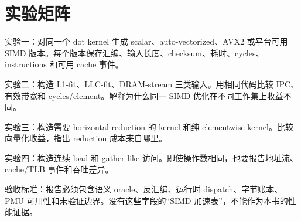 \section{实验矩阵}

实验一：对同一个 dot kernel 生成 scalar、auto-vectorized、AVX2 或平台可用 SIMD 版本。每个版本保存汇编、输入长度、checksum、耗时、cycles、instructions 和可用 cache 事件。

实验二：构造 L1-fit、LLC-fit、DRAM-stream 三类输入。用相同代码比较 IPC、有效带宽和 cycles/element。解释为什么同一 SIMD 优化在不同工作集上收益不同。

实验三：构造需要 horizontal reduction 的 kernel 和纯 elementwise kernel。比较向量化收益，指出 reduction 成本来自哪里。

实验四：构造连续 load 和 gather-like 访问。即使操作数相同，也要报告地址流、cache/TLB 事件和吞吐差异。

验收标准：报告必须包含语义 oracle、反汇编、运行时 dispatch、字节账本、PMU 可用性和未验证边界。没有这些字段的“SIMD 加速表”，不能作为本书的性能证据。
